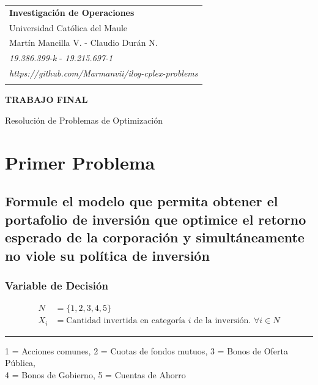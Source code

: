 \documentclass[a4paper,12pt]{article}
\begin{document}
	
\thispagestyle{empty}

\begin{tabular}{p{15.5cm}}
	{\large \bf Investigación de Operaciones} \\
	Universidad Católica del Maule \\ 
	Martín Mancilla V. - Claudio Durán N.\\
	\textit{19.386.399-k} - \textit{19.215.697-1} \\
	\textit{https://github.com/Marmanvii/ilog-cplex-problems}\\
	\hline
	\\
\end{tabular}

\vspace*{0.3cm}

\begin{center}
	{\Large \bf TRABAJO FINAL} 
	\vspace{2mm}
	
	{Resolución de Problemas de Optimización}
	
\end{center}  

\vspace{0.4cm}

\section{Primer Problema}
\subsection{Formule  el  modelo  que  permita  obtener  el  portafolio de  inversión  que  optimice  el  retorno  esperado  de  la	corporación y simultáneamente no viole su política de inversión}
\subsubsection{Variable de Decisión}
\begin{equation*}
	\begin{split}
		N &= \{1,2,3,4,5\} \\
		X_i & = \text{Cantidad invertida en categoría } i \text{ de la inversión. } \forall i \in N
	\end{split}
\end{equation*}
\begin{center}
	\noindent\rule{12cm}{0.4pt}
\end{center}
\begin{shadedbox}
1 = Acciones comunes, 2 = Cuotas de fondos mutuos, 3 = Bonos de Oferta Pública,\\ 4 = Bonos de Gobierno, 5 = Cuentas de Ahorro
\end{shadedbox}
\end{document}
